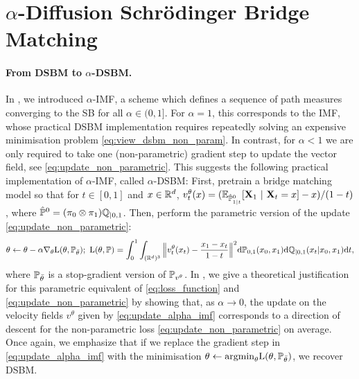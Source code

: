 \documentclass{article}
\begin{document}
\section{$\alpha$-Diffusion Schr\"odinger Bridge Matching}
\label{sec:online_dsbm}

\paragraph{From DSBM to $\alpha$-DSBM.} In , we introduced $\alpha$-IMF, a scheme which defines a sequence of path measures converging to the SB for all $\alpha \in (0,1]$. For $\alpha=1$, this corresponds to the IMF, whose practical DSBM implementation \citep{shi2023DSBM} requires repeatedly solving an expensive minimisation problem \eqref{eq:view_dsbm_non_param}. In contrast, for $\alpha < 1$ we are only required to take one (non-parametric) gradient step to update the vector field, see \eqref{eq:update_non_parametric}. This suggests the following practical implementation of $\alpha$-IMF, called $\alpha$-DSBM: First, pretrain a bridge matching model so that for $t \in [0,1]$ and $x \in \mathbb{R}^d$, $v_t^\theta(x) = (\mathbb{E}_{\hat{\mathbb{P}}^0_{1|t}}[\mathbf{X}_1 \ | \ \mathbf{X}_t = x] - x)/(1-t)$, where $\hat{\mathbb{P}}^0 = (\pi_0 \otimes \pi_1) \mathbb{Q}_{|0,1} $. Then, perform the parametric version of the update \eqref{eq:update_non_parametric}:
\begin{equation}
\label{eq:update_alpha_imf}
    \theta \leftarrow \theta - \alpha \nabla_\theta \Lparam(\theta, \Pbb_{\bar{\theta}})  ; \  \Lparam(\theta, \Pbb) =  \int_0^1 \int_{(\rset^d)^3} \Big\| v_t^\theta(x_t) - \frac{x_1 - x_t}{1 - t} \Big\|^2 \rmd \Pbb_{0,1}(x_0, x_1) \rmd \Qbb_{|0,1}(x_t|x_0,x_1) \rmd t ,
\end{equation}
where $\mathbb{P}_{\bar{\theta}}$ is a stop-gradient version of $\mathbb{P}_{v^\theta}$. In , we give a theoretical justification for this parametric equivalent of \eqref{eq:loss_function} and \eqref{eq:update_non_parametric} by showing that, as $\alpha \to 0$, the update on the velocity fields $v^\theta$ given by \eqref{eq:update_alpha_imf} corresponds to a direction of descent for the non-parametric loss \eqref{eq:update_non_parametric} on average. Once again, we emphasize that if we replace the gradient step in \eqref{eq:update_alpha_imf} with the minimisation $\theta \leftarrow \mathrm{argmin}_\theta \mathrm{L}(\theta, \mathbb{P}_{\bar{\theta}})$, we  recover DSBM. 
\end{document}
